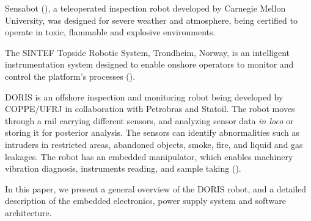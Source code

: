 \documentclass{ifacconf}
\begin{document}
Sensabot (\cite{sensabot}), a teleoperated inspection robot
developed by Carnegie Mellon University, was designed for severe weather and
atmosphere, being certified to operate in toxic, flammable and explosive
environments.




The SINTEF Topside Robotic System, Trondheim, Norway, is an intelligent
instrumentation system designed to enable onshore operators to monitor and
control the platform's processes (\cite{kyrkjebo2009robotic}).


DORIS is an offshore inspection and monitoring robot being developed by
COPPE/UFRJ in collaboration with Petrobras and Statoil. The robot moves
through a rail carrying different sensors, and
analyzing sensor data \emph{in loco} or storing it for posterior analysis. The
sensors can identify abnormalities such as intruders in restricted areas,
abandoned objects, smoke, fire, and liquid and gas leakages.
The robot has an embedded manipulator, which enables machinery vibration
diagnosis, instruments reading, and sample taking (\cite{cba}).

In this paper, we present a general overview of the DORIS robot, and a detailed
description of the embedded electronics, power supply system and software
architecture.
\end{document}
